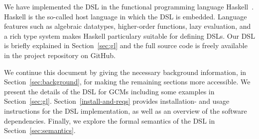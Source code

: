 
We have implemented the \acl{DSL} in the functional programming
language Haskell~\cite{haskell98}.
%
Haskell is the so-called host language in which the \ac{DSL} is
embedded.
%
Language features such as algebraic datatypes, higher-order functions,
lazy evaluation, and a rich type system makes Haskell particulary
suitable for defining \acp{DSL}.
%
Our \ac{DSL} is briefly explained in Section~\ref{sec:gl} and the
full source code is freely available in the project repository on
GitHub.


We continue this document by giving the necessary background
information, in Section~\ref{sec:background}, for making the remaining
sections more accessible.
%
We present the details of the \ac{DSL} for \acp{GCM} including some
examples in Section~\ref{sec:gl}.
%
Section~\ref{install-and-reqs} provides installation- and usage
instructions for the \ac{DSL} implementation, as well as an overview
of the software dependencies.
%
Finally, we explore the formal semantics of the \ac{DSL} in
Section~\ref{sec:semantics}.
